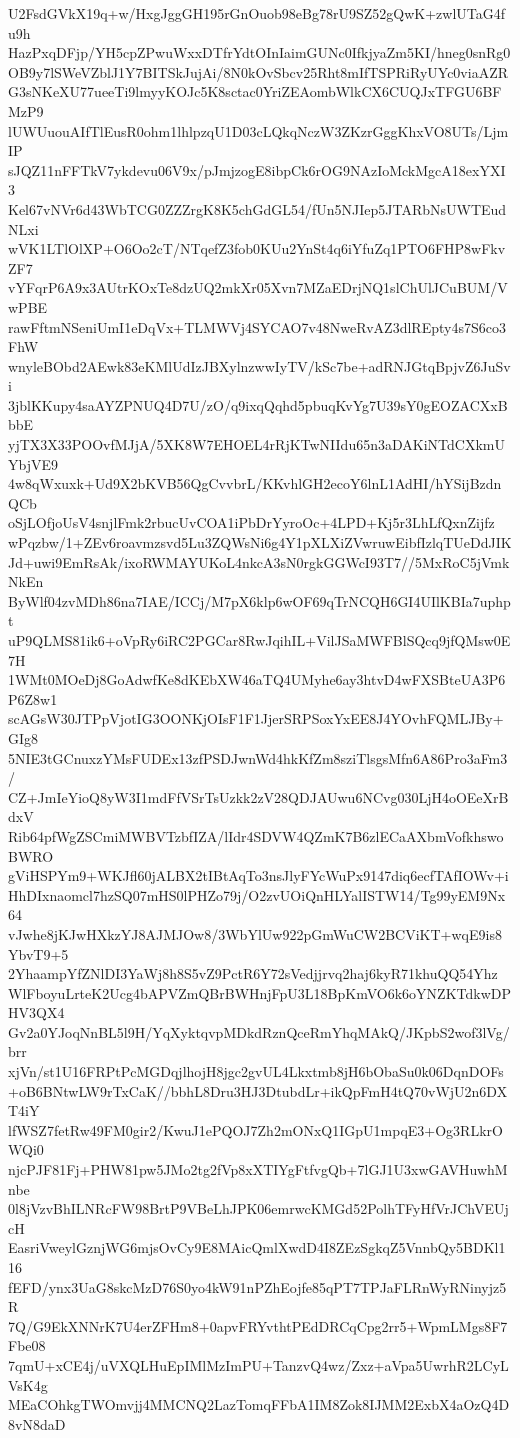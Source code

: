 U2FsdGVkX19q+w/HxgJggGH195rGnOuob98eBg78rU9SZ52gQwK+zwlUTaG4fu9h
HazPxqDFjp/YH5cpZPwuWxxDTfrYdtOInIaimGUNc0IfkjyaZm5KI/hneg0snRg0
OB9y7lSWeVZblJ1Y7BITSkJujAi/8N0kOvSbcv25Rht8mIfTSPRiRyUYc0viaAZR
G3sNKeXU77ueeTi9lmyyKOJc5K8sctac0YriZEAombWlkCX6CUQJxTFGU6BFMzP9
lUWUuouAIfTlEusR0ohm1lhlpzqU1D03cLQkqNczW3ZKzrGggKhxVO8UTs/LjmIP
sJQZ11nFFTkV7ykdevu06V9x/pJmjzogE8ibpCk6rOG9NAzIoMckMgcA18exYXI3
Kel67vNVr6d43WbTCG0ZZZrgK8K5chGdGL54/fUn5NJIep5JTARbNsUWTEudNLxi
wVK1LTlOlXP+O6Oo2cT/NTqefZ3fob0KUu2YnSt4q6iYfuZq1PTO6FHP8wFkvZF7
vYFqrP6A9x3AUtrKOxTe8dzUQ2mkXr05Xvn7MZaEDrjNQ1slChUlJCuBUM/VwPBE
rawFftmNSeniUmI1eDqVx+TLMWVj4SYCAO7v48NweRvAZ3dlREpty4s7S6co3FhW
wnyleBObd2AEwk83eKMlUdIzJBXylnzwwIyTV/kSc7be+adRNJGtqBpjvZ6JuSvi
3jblKKupy4saAYZPNUQ4D7U/zO/q9ixqQqhd5pbuqKvYg7U39sY0gEOZACXxBbbE
yjTX3X33POOvfMJjA/5XK8W7EHOEL4rRjKTwNIIdu65n3aDAKiNTdCXkmUYbjVE9
4w8qWxuxk+Ud9X2bKVB56QgCvvbrL/KKvhlGH2ecoY6lnL1AdHI/hYSijBzdnQCb
oSjLOfjoUsV4snjlFmk2rbucUvCOA1iPbDrYyroOc+4LPD+Kj5r3LhLfQxnZijfz
wPqzbw/1+ZEv6roavmzsvd5Lu3ZQWsNi6g4Y1pXLXiZVwruwEibfIzlqTUeDdJIK
Jd+uwi9EmRsAk/ixoRWMAYUKoL4nkcA3sN0rgkGGWcI93T7//5MxRoC5jVmkNkEn
ByWlf04zvMDh86na7IAE/ICCj/M7pX6klp6wOF69qTrNCQH6GI4UIlKBIa7uphpt
uP9QLMS81ik6+oVpRy6iRC2PGCar8RwJqihIL+VilJSaMWFBlSQcq9jfQMsw0E7H
1WMt0MOeDj8GoAdwfKe8dKEbXW46aTQ4UMyhe6ay3htvD4wFXSBteUA3P6P6Z8w1
scAGsW30JTPpVjotIG3OONKjOIsF1F1JjerSRPSoxYxEE8J4YOvhFQMLJBy+GIg8
5NIE3tGCnuxzYMsFUDEx13zfPSDJwnWd4hkKfZm8sziTlsgsMfn6A86Pro3aFm3/
CZ+JmIeYioQ8yW3I1mdFfVSrTsUzkk2zV28QDJAUwu6NCvg030LjH4oOEeXrBdxV
Rib64pfWgZSCmiMWBVTzbfIZA/lIdr4SDVW4QZmK7B6zlECaAXbmVofkhswoBWRO
gViHSPYm9+WKJfl60jALBX2tIBtAqTo3nsJlyFYcWuPx9147diq6ecfTAfIOWv+i
HhDIxnaomcl7hzSQ07mHS0lPHZo79j/O2zvUOiQnHLYalISTW14/Tg99yEM9Nx64
vJwhe8jKJwHXkzYJ8AJMJOw8/3WbYlUw922pGmWuCW2BCViKT+wqE9is8YbvT9+5
2YhaampYfZNlDI3YaWj8h8S5vZ9PctR6Y72sVedjjrvq2haj6kyR71khuQQ54Yhz
WlFboyuLrteK2Ucg4bAPVZmQBrBWHnjFpU3L18BpKmVO6k6oYNZKTdkwDPHV3QX4
Gv2a0YJoqNnBL5l9H/YqXyktqvpMDkdRznQceRmYhqMAkQ/JKpbS2wof3lVg/brr
xjVn/st1U16FRPtPcMGDqjlhojH8jgc2gvUL4Lkxtmb8jH6bObaSu0k06DqnDOFs
+oB6BNtwLW9rTxCaK//bbhL8Dru3HJ3DtubdLr+ikQpFmH4tQ70vWjU2n6DXT4iY
lfWSZ7fetRw49FM0gir2/KwuJ1ePQOJ7Zh2mONxQ1IGpU1mpqE3+Og3RLkrOWQi0
njcPJF81Fj+PHW81pw5JMo2tg2fVp8xXTIYgFtfvgQb+7lGJ1U3xwGAVHuwhMnbe
0l8jVzvBhILNRcFW98BrtP9VBeLhJPK06emrwcKMGd52PolhTFyHfVrJChVEUjcH
EasriVweylGznjWG6mjsOvCy9E8MAicQmlXwdD4I8ZEzSgkqZ5VnnbQy5BDKl116
fEFD/ynx3UaG8skcMzD76S0yo4kW91nPZhEojfe85qPT7TPJaFLRnWyRNinyjz5R
7Q/G9EkXNNrK7U4erZFHm8+0apvFRYvthtPEdDRCqCpg2rr5+WpmLMgs8F7Fbe08
7qmU+xCE4j/uVXQLHuEpIMlMzImPU+TanzvQ4wz/Zxz+aVpa5UwrhR2LCyLVsK4g
MEaCOhkgTWOmvjj4MMCNQ2LazTomqFFbA1IM8Zok8IJMM2ExbX4aOzQ4D8vN8daD
